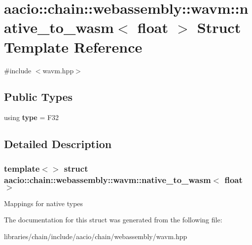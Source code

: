 \hypertarget{structaacio_1_1chain_1_1webassembly_1_1wavm_1_1native__to__wasm_3_01float_01_4}{}\section{aacio\+:\+:chain\+:\+:webassembly\+:\+:wavm\+:\+:native\+\_\+to\+\_\+wasm$<$ float $>$ Struct Template Reference}
\label{structaacio_1_1chain_1_1webassembly_1_1wavm_1_1native__to__wasm_3_01float_01_4}


{\ttfamily \#include $<$wavm.\+hpp$>$}

\subsection*{Public Types}
\begin{DoxyCompactItemize}
\item 
\mbox{\label{structaacio_1_1chain_1_1webassembly_1_1wavm_1_1native__to__wasm_3_01float_01_4_a9d5f9eb849922f4eb6b704aa3502fbcd}} 
using {\bfseries type} = F32
\end{DoxyCompactItemize}


\subsection{Detailed Description}
\subsubsection*{template$<$$>$\newline
struct aacio\+::chain\+::webassembly\+::wavm\+::native\+\_\+to\+\_\+wasm$<$ float $>$}

Mappings for native types 

The documentation for this struct was generated from the following file\+:\begin{DoxyCompactItemize}
\item 
libraries/chain/include/aacio/chain/webassembly/wavm.\+hpp\end{DoxyCompactItemize}
